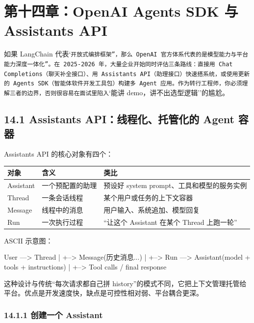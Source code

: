 \chapter{第十四章：OpenAI Agents SDK 与 Assistants API}

如果 LangChain 代表`\texttt{开放式编排框架''，那么 OpenAI 官方体系代表的是}\texttt{模型能力与平台能力深度一体化''。在 2025-2026 年，大量企业开始同时评估三条路线：直接用 Chat Completions（聊天补全接口）、用 Assistants API（助理接口）快速搭系统，或使用更新的 Agents SDK（智能体软件开发工具包）构建多 Agent 应用。作为转行工程师，你必须理解三者的边界，否则很容易在面试里陷入}`能讲 demo，讲不出选型逻辑''的尴尬。


\section{14.1 Assistants API：线程化、托管化的 Agent 容器}

Assistants API 的核心对象有四个：


\begingroup
\scriptsize
\setlength{\tabcolsep}{3pt}
\begin{longtable}{|p{}|p{}|p{}|}
\hline
对象 & 含义 & 类比 \\ \hline
Assistant & 一个预配置的助理 & 预设好 system prompt、工具和模型的服务实例 \\ \hline
Thread & 一条会话线程 & 某个用户或任务的上下文容器 \\ \hline
Message & 线程中的消息 & 用户输入、系统追加、模型回复 \\ \hline
Run & 一次执行过程 & ``让这个 Assistant 在某个 Thread 上跑一轮'' \\ \hline
\end{longtable}
\endgroup

ASCII 示意图：


\begin{codeblock}
User ---> Thread
           |
           +--> Message(历史消息...)
           |
           +--> Run ---> Assistant(model + tools + instructions)
                              |
                              +--> Tool calls / final response
\end{codeblock}

这种设计与传统``每次请求都自己拼 history''的模式不同，它把上下文管理托管给平台。优点是开发速度快，缺点是可控性相对弱、平台耦合更深。


\subsection{14.1.1 创建一个 Assistant}


